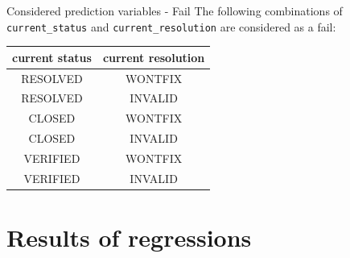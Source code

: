 \documentclass[xcolor=svgnames,handout]{beamer}
\begin{document}
\begin{frame}{Considered prediction variables - Fail}
  The following combinations of \texttt{current\_status} and \texttt{current\_resolution} are considered as a fail:\\
  \begin{table}[]
\centering
\label{my-label}
\begin{tabular}{cc}
\textbf{current status} & \textbf{current resolution} \\ \hline
RESOLVED                 & WONTFIX                      \\
RESOLVED                 & INVALID                      \\
CLOSED                   & WONTFIX                      \\
CLOSED                   & INVALID                      \\
VERIFIED                 & WONTFIX                      \\
VERIFIED                 & INVALID
\end{tabular}
\end{table}              
\end{frame}

\section
  {Results of regressions}
\end{document}
